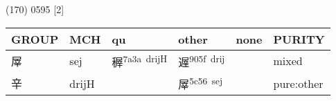 \documentclass[14pt,a4paper]{scrartcl}
\begin{document}
(170) 0595 {[}2{]}

\begin{longtable}[c]{@{}llllll@{}}
\toprule
\begin{minipage}[b]{0.14\columnwidth}\raggedright\strut
GROUP
\strut\end{minipage} &
\begin{minipage}[b]{0.14\columnwidth}\raggedright\strut
MCH
\strut\end{minipage} &
\begin{minipage}[b]{0.14\columnwidth}\raggedright\strut
qu
\strut\end{minipage} &
\begin{minipage}[b]{0.14\columnwidth}\raggedright\strut
other
\strut\end{minipage} &
\begin{minipage}[b]{0.14\columnwidth}\raggedright\strut
none
\strut\end{minipage} &
\begin{minipage}[b]{0.14\columnwidth}\raggedright\strut
PURITY
\strut\end{minipage}\tabularnewline
\midrule
\endhead
\begin{minipage}[t]{0.14\columnwidth}\raggedright\strut
屖
\strut\end{minipage} &
\begin{minipage}[t]{0.14\columnwidth}\raggedright\strut
sej
\strut\end{minipage} &
\begin{minipage}[t]{0.14\columnwidth}\raggedright\strut
稺\textsuperscript{7a3a~drijH}
\strut\end{minipage} &
\begin{minipage}[t]{0.14\columnwidth}\raggedright\strut
遟\textsuperscript{905f~drij}
\strut\end{minipage} &
\begin{minipage}[t]{0.14\columnwidth}\raggedright\strut
\strut\end{minipage} &
\begin{minipage}[t]{0.14\columnwidth}\raggedright\strut
mixed
\strut\end{minipage}\tabularnewline
\begin{minipage}[t]{0.14\columnwidth}\raggedright\strut
辛
\strut\end{minipage} &
\begin{minipage}[t]{0.14\columnwidth}\raggedright\strut
drijH
\strut\end{minipage} &
\begin{minipage}[t]{0.14\columnwidth}\raggedright\strut
\strut\end{minipage} &
\begin{minipage}[t]{0.14\columnwidth}\raggedright\strut
屖\textsuperscript{5c56~sej}
\strut\end{minipage} &
\begin{minipage}[t]{0.14\columnwidth}\raggedright\strut
\strut\end{minipage} &
\begin{minipage}[t]{0.14\columnwidth}\raggedright\strut
pure:other
\strut\end{minipage}\tabularnewline
\bottomrule
\end{longtable}
\end{document}
